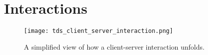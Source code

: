\documentclass[../design_doc.tex]{subfiles}
\begin{document}
\section{Interactions}\label{sec:interationdiagrams}
    \begin{figure}
        \centering
        \texttt{[image: tds\_client\_server\_interaction.png]}
        \caption{A simplified view of how a client-server interaction unfolds.}\label{fig:clientserverinteraction}
    \end{figure}
\end{document}
